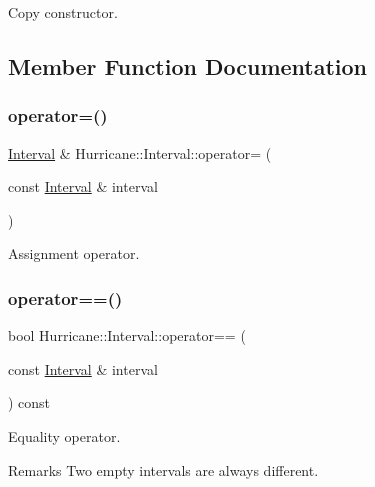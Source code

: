 Copy constructor. 

\subsection{Member Function Documentation}
\mbox{\label{classHurricane_1_1Interval_a337b424cea8024f574726c3a2e4935b8}} 
\subsubsection{\texorpdfstring{operator=()}{operator=()}}
{\footnotesize\ttfamily \mbox{\hyperlink{classHurricane_1_1Interval}{Interval}} \& Hurricane\+::\+Interval\+::operator= (\begin{DoxyParamCaption}\item[{const \mbox{\hyperlink{classHurricane_1_1Interval}{Interval}} \&}]{interval }\end{DoxyParamCaption})}

Assignment operator. \mbox{\label{classHurricane_1_1Interval_a1b022ac0ad975f168ac2b2689e6368c3}} 
\subsubsection{\texorpdfstring{operator==()}{operator==()}}
{\footnotesize\ttfamily bool Hurricane\+::\+Interval\+::operator== (\begin{DoxyParamCaption}\item[{const \mbox{\hyperlink{classHurricane_1_1Interval}{Interval}} \&}]{interval }\end{DoxyParamCaption}) const}

Equality operator.

\begin{DoxyRemark}{Remarks}
Two empty intervals are always different. 
\end{DoxyRemark}
\mbox{\label{classHurricane_1_1Interval_a2e5a64c485269fb08fb762e1eb3bc374}} 
